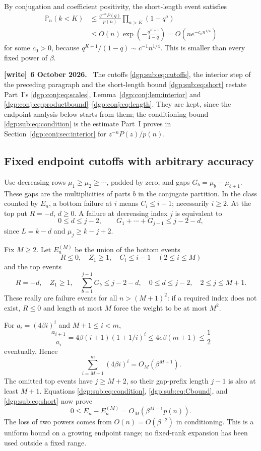 \documentclass[11pt,letterpaper]{article}
\numberwithin{equation}{section}
\theoremstyle{remark}\newtheorem{remark}[theorem]{Remark}
\newcommand{\PP}{\mathbb P}
\newenvironment{writenote}[1][]{\par\smallskip\begingroup\small
 \noindent\textbf{[write]}\if\relax\detokenize{#1}\relax\else~\textbf{#1.}\fi\ }%
 {\par\endgroup\smallskip}
\begin{document}
By conjugation and coefficient positivity, the short-length event
satisfies
\begin{align}\label{dgp:sub:eq:short}
 \PP_n(k<K)&\leq\frac{q^{-n}P(q)}{p(n)}\prod_{a>K}(1-q^a)\nonumber\\
 &\leq O(n)\exp\!\left(-\frac{q^{K+1}}{1-q}\right)
   =O(ne^{-c_0n^{1/4}})
\end{align}
for some $c_0>0$, because $q^{K+1}/(1-q)\sim c^{-1}n^{1/4}$.
This is smaller than every fixed power of $\beta$.
\begin{writenote}[6 October 2026]
The cutoffs \eqref{dgp:sub:eq:cutoffs}, the interior step of the preceding paragraph and the short-length bound \eqref{dgp:sub:eq:short} restate Part~I's \eqref{dgp:conj:eq:scales}, Lemma~\ref{dgp:conj:lem:interior} and \eqref{dgp:conj:eq:productbound}--\eqref{dgp:conj:eq:length}. They are kept, since the endpoint analysis below starts from them; the conditioning bound \eqref{dgp:sub:eq:condition} is the estimate Part~I proves in Section~\ref{dgp:conj:sec:interior} for $z^{-n}P(z)/p(n)$.
\end{writenote}

\subsection{Fixed endpoint cutoffs with arbitrary accuracy}
Use decreasing rows $\mu_1\geq\mu_2\geq\cdots$, padded by zero,
and gaps $G_b=\mu_b-\mu_{b+1}$. These gaps are the multiplicities
of parts $b$ in the conjugate partition. In the class counted by
$E_n$, a bottom failure at $i$ means $C_i\leq i-1$; necessarily
$i\geq2$. At the top put $R=-d$, $d\geq0$. A failure at decreasing
index $j$ is equivalent to
\begin{equation}\label{dgp:sub:eq:topfailure}
 0\leq d\leq j-2,\qquad
 G_1+\cdots+G_{j-1}\leq j-2-d,
\end{equation}
since $L=k-d$ and $\mu_j\geq k-j+2$.

Fix $M\geq2$. Let $E_n^{(M)}$ be the union of the bottom events
\[
 R\leq0,\quad Z_1\geq1,\quad C_i\leq i-1
                     \quad(2\leq i\leq M)
\]
and the top events
\[
 R=-d,\quad Z_1\geq1,\quad
 \sum_{b=1}^{j-1}G_b\leq j-2-d,
 \quad 0\leq d\leq j-2,\quad 2\leq j\leq M+1.
\]
These really are failure events for all $n>(M+1)^2$: if a required
index does not exist, $R\leq0$ and length at most $M$ force the
weight to be at most $M^2$.

For $a_i=(4\beta i)^i$ and $M+1\leq i<m$,
\[
 \frac{a_{i+1}}{a_i}
 =4\beta(i+1)(1+1/i)^i\leq4e\beta(m+1)\leq\frac12
\]
eventually. Hence
\[
 \sum_{i=M+1}^{m}(4\beta i)^i=O_M(\beta^{M+1}).
\]
The omitted top events have $j\geq M+2$, so their gap-prefix length
$j-1$ is also at least $M+1$. Equations \eqref{dgp:sub:eq:condition},
\eqref{dgp:sub:eq:Cbound}, and \eqref{dgp:sub:eq:short} now prove
\begin{equation}\label{dgp:sub:eq:tail}
 0\leq E_n-E_n^{(M)}=O_M(\beta^{M-1}p(n)).
\end{equation}
The loss of two powers comes from $O(n)=O(\beta^{-2})$ in
conditioning. This is a uniform bound on a growing endpoint range;
no fixed-rank expansion has been used outside a fixed range.
\end{document}
